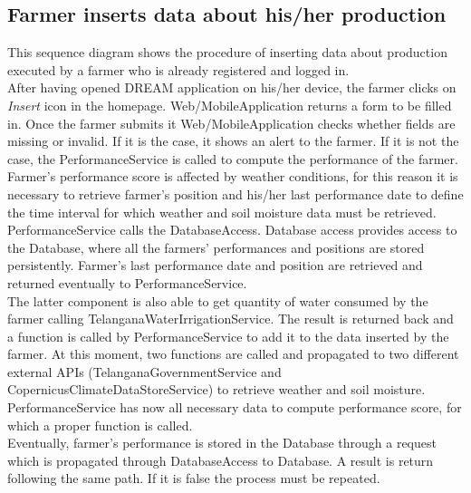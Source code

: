 \subsection{Farmer inserts data about his/her production}

This sequence diagram shows the procedure of inserting data about production executed by a farmer who is already registered and logged in.\\
After having opened DREAM application on his/her device, the farmer clicks on \textit{Insert} icon in the homepage. Web/MobileApplication returns a form to be filled in. Once the farmer submits it Web/MobileApplication checks whether fields are missing or invalid. If it is the case, it shows an alert to the farmer. If it is not the case, the PerformanceService is called to compute the performance of the farmer.\\
Farmer's performance score is affected by weather conditions, for this reason it is necessary to retrieve farmer's position and his/her last performance date to define the time interval for which weather and soil moisture data must be retrieved. PerformanceService calls the DatabaseAccess. Database access provides access to the Database, where all the farmers' performances and positions are stored persistently. Farmer's last performance date and position are retrieved and returned eventually to PerformanceService.\\
The latter component is also able to get quantity of water consumed by the farmer calling TelanganaWaterIrrigationService. The result is returned back and a function is called by PerformanceService to add it to  the data inserted by the farmer. At this moment, two functions are called and propagated to two different external APIs (TelanganaGovernmentService and CopernicusClimateDataStoreService) to retrieve weather and soil moisture.\\ 
PerformanceService has now all necessary data to compute performance score, for which a proper function is called.\\
Eventually, farmer's performance is stored in the Database through a request which is propagated through DatabaseAccess to Database. A result is return following the same path. If it is false the process must be repeated. 

